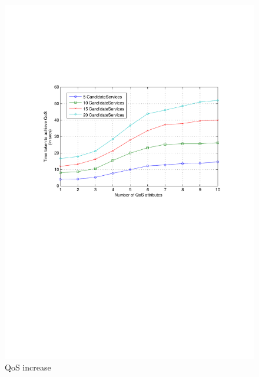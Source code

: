 \documentclass[10pt,journal,compsoc]{IEEEtran}
\begin{document}
\begin{figure}[htbp]
  \centering
  \includegraphics[clip, trim=0cm 14cm 2cm 6cm, scale=0.42]{graphs/5_10_15_20_svc_per_qos_scaling.pdf}
  \caption{QoS increase \label{fig:svc_per_qos}}
\end{figure}
\end{document}
